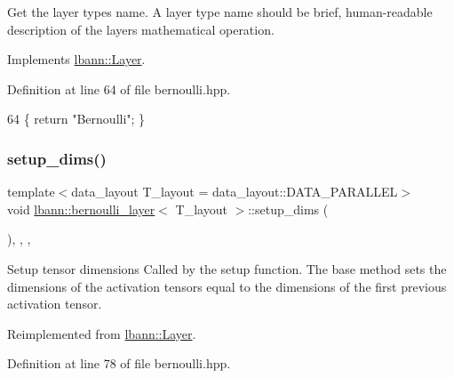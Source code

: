 Get the layer type\textquotesingle{}s name. A layer type name should be brief, human-\/readable description of the layer\textquotesingle{}s mathematical operation. 

Implements \hyperlink{classlbann_1_1Layer_a0fa0ea9160b490c151c0a17fde4f7239}{lbann\+::\+Layer}.



Definition at line 64 of file bernoulli.\+hpp.


\begin{DoxyCode}
64 \{ \textcolor{keywordflow}{return} \textcolor{stringliteral}{"Bernoulli"}; \}
\end{DoxyCode}
\mbox{\label{classlbann_1_1bernoulli__layer_aabaf1d2ba92aa4c708d3a76d82bdbdb6}} 
\subsubsection{\texorpdfstring{setup\+\_\+dims()}{setup\_dims()}}
{\footnotesize\ttfamily template$<$data\+\_\+layout T\+\_\+layout = data\+\_\+layout\+::\+D\+A\+T\+A\+\_\+\+P\+A\+R\+A\+L\+L\+EL$>$ \\
void \hyperlink{classlbann_1_1bernoulli__layer}{lbann\+::bernoulli\+\_\+layer}$<$ T\+\_\+layout $>$\+::setup\+\_\+dims (\begin{DoxyParamCaption}{ }\end{DoxyParamCaption})\hspace{0.3cm}{\ttfamily [inline]}, {\ttfamily [override]}, {\ttfamily [protected]}, {\ttfamily [virtual]}}

Setup tensor dimensions Called by the setup function. The base method sets the dimensions of the activation tensors equal to the dimensions of the first previous activation tensor. 

Reimplemented from \hyperlink{classlbann_1_1Layer_a90fce1b06c1f2abb480e18cfe08a9746}{lbann\+::\+Layer}.



Definition at line 78 of file bernoulli.\+hpp.


